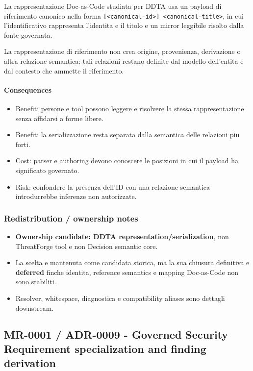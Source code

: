 \documentclass[
  10pt,
]{article}
\providecommand{\tightlist}{%
  \setlength{\itemsep}{0pt}\setlength{\parskip}{0pt}}
\begin{document}
La rappresentazione Doc-as-Code studiata per DDTA usa un payload di
riferimento canonico nella forma
\texttt{{[}\textless{}canonical-id\textgreater{}{]}\ \textless{}canonical-title\textgreater{}},
in cui l'identificativo rappresenta l'identita e il titolo e un mirror
leggibile risolto dalla fonte governata.

La rappresentazione di riferimento non crea origine, provenienza,
derivazione o altra relazione semantica: tali relazioni restano definite
dal modello dell'entita e dal contesto che ammette il riferimento.

\paragraph{Consequences}\label{consequences-13}

\begin{itemize}
\tightlist
\item
  Benefit: persone e tool possono leggere e risolvere la stessa
  rappresentazione senza affidarsi a forme libere.
\item
  Benefit: la serializzazione resta separata dalla semantica delle
  relazioni piu forti.
\item
  Cost: parser e authoring devono conoscere le posizioni in cui il
  payload ha significato governato.
\item
  Risk: confondere la presenza dell'ID con una relazione semantica
  introdurrebbe inferenze non autorizzate.
\end{itemize}

\subsubsection{Redistribution / ownership
notes}\label{redistribution-ownership-notes-6}

\begin{itemize}
\tightlist
\item
  \textbf{Ownership candidate: DDTA representation/serialization}, non
  ThreatForge tool e non Decision semantic core.
\item
  La scelta e mantenuta come candidata storica, ma la sua chiusura
  definitiva e \textbf{deferred} finche identita, reference semantics e
  mapping Doc-as-Code non sono stabiliti.
\item
  Resolver, whitespace, diagnostica e compatibility aliases sono
  dettagli downstream.
\end{itemize}

\subsection{MR-0001 / ADR-0009 - Governed Security Requirement
specialization and finding
derivation}\label{mr-0001-adr-0009---governed-security-requirement-specialization-and-finding-derivation}
\end{document}
